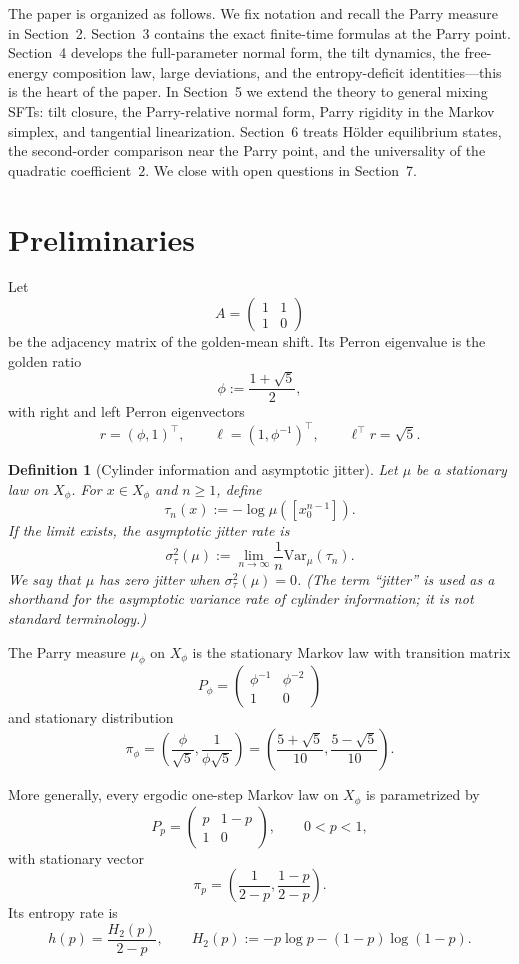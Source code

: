 \documentclass[pdflatex,sn-basic,Numbered]{sn-jnl}
\theoremstyle{thmstyleone}
\theoremstyle{thmstyletwo}
\theoremstyle{thmstylethree}
\newtheorem{definition}[theorem]{Definition}
\newcommand{\Var}{\mathrm{Var}}
\begin{document}
The paper is organized as follows. We fix notation and recall the Parry measure in Section~2. Section~3 contains the exact finite-time formulas at the Parry point. Section~4 develops the full-parameter normal form, the tilt dynamics, the free-energy composition law, large deviations, and the entropy-deficit identities---this is the heart of the paper. In Section~5 we extend the theory to general mixing SFTs: tilt closure, the Parry-relative normal form, Parry rigidity in the Markov simplex, and tangential linearization. Section~6 treats H\"older equilibrium states, the second-order comparison near the Parry point, and the universality of the quadratic coefficient~$2$. We close with open questions in Section~7.

\section{Preliminaries}

Let
\[
A=\begin{pmatrix}1&1\\1&0\end{pmatrix}
\]
be the adjacency matrix of the golden-mean shift. Its Perron eigenvalue is the golden ratio
\[
\phi:=\frac{1+\sqrt{5}}{2},
\]
with right and left Perron eigenvectors
\[
r=(\phi,1)^\top,
\qquad
\ell=(1,\phi^{-1})^\top,
\qquad
\ell^\top r=\sqrt{5}.
\]

\begin{definition}[Cylinder information and asymptotic jitter]
Let $\mu$ be a stationary law on $X_\phi$. For $x\in X_\phi$ and $n\ge 1$, define
\[
\tau_n(x):=-\log\mu([x_0^{n-1}]).
\]
If the limit exists, the asymptotic jitter rate is
\[
\sigma_\tau^2(\mu):=\lim_{n\to\infty}\frac{1}{n}\Var_\mu(\tau_n).
\]
We say that $\mu$ has \emph{zero jitter} when $\sigma_\tau^2(\mu)=0$. (The term ``jitter'' is used as a shorthand for the asymptotic variance rate of cylinder information; it is not standard terminology.)
\end{definition}

The Parry measure $\mu_\phi$ on $X_\phi$ is the stationary Markov law with transition matrix
\[
P_\phi=
\begin{pmatrix}
\phi^{-1} & \phi^{-2} \\
1 & 0
\end{pmatrix}
\]
and stationary distribution
\[
\pi_\phi=
\left(\frac{\phi}{\sqrt{5}},\frac{1}{\phi\sqrt{5}}\right)
=
\left(\frac{5+\sqrt{5}}{10},\frac{5-\sqrt{5}}{10}\right).
\]

More generally, every ergodic one-step Markov law on $X_\phi$ is parametrized by
\[
P_p=
\begin{pmatrix}
p & 1-p \\
1 & 0
\end{pmatrix},
\qquad 0<p<1,
\]
with stationary vector
\[
\pi_p=\left(\frac{1}{2-p},\frac{1-p}{2-p}\right).
\]
Its entropy rate is
\[
h(p)=\frac{H_2(p)}{2-p},
\qquad
H_2(p):=-p\log p-(1-p)\log(1-p).
\]
\end{document}
